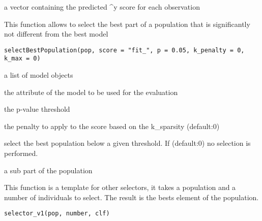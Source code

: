 \documentclass[a4paper]{book}
\begin{document}
%
\begin{Value}
a vector containing the predicted \textasciicircum{}y score for each observation
\end{Value}
%
\begin{Description}
This function allows to select the best part of a population that is significantly not different from the best model
\end{Description}
%
\begin{Usage}
\begin{verbatim}
selectBestPopulation(pop, score = "fit_", p = 0.05, k_penalty = 0, k_max = 0)
\end{verbatim}
\end{Usage}
%
\begin{Arguments}
\begin{ldescription}
\item[\code{pop:}] a list of model objects

\item[\code{score:}] the attribute of the model to be used for the evaluation

\item[\code{p:}] the p-value threshold

\item[\code{k\_penalty:}] the penalty to apply to the score based on the k\_sparsity (default:0)

\item[\code{k\_max:}] select the best population below a given threshold. If (default:0) no selection is performed.
\end{ldescription}
\end{Arguments}
%
\begin{Value}
a sub part of the population
\end{Value}
%
\begin{Description}
This function is a template for other selectors, it takes a population and a number of individuals to select. The result is the  bests element of the population.
\end{Description}
%
\begin{Usage}
\begin{verbatim}
selector_v1(pop, number, clf)
\end{verbatim}
\end{Usage}
\end{document}

